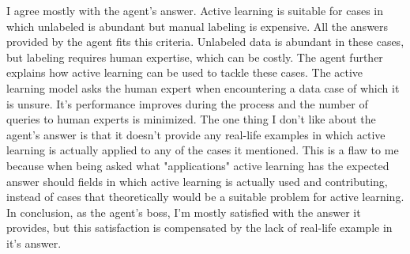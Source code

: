 \documentclass[11pt]{article}
\theoremstyle{definition}
\begin{document}
I agree mostly with the agent's answer. Active learning is suitable for cases in which unlabeled is abundant but manual labeling is expensive. All the answers provided by the agent fits this criteria. Unlabeled data is abundant in these cases, but labeling requires human expertise, which can be costly. The agent further explains how active learning can be used to tackle these cases. The active learning model asks the human expert when encountering a data case of which it is unsure. It's performance improves during the process and the number of queries to human experts is minimized. The one thing I don't like about the agent's answer is that it doesn't provide any real-life examples in which active learning is actually applied to any of the cases it mentioned. This is a flaw to me because when being asked what "applications" active learning has the expected answer should fields in which active learning is actually used and contributing, instead of cases that theoretically would be a suitable problem for active learning. In conclusion, as the agent's boss, I'm mostly satisfied with the answer it provides, but this satisfaction is compensated by the lack of real-life example in it's answer.
\newpage
\end{document}
